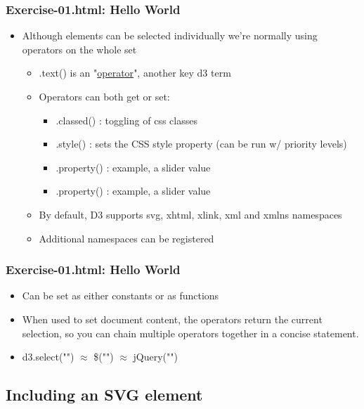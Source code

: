 \documentclass{beamer}
\begin{document}
\begin{frame}
    \frametitle{Exercise-01.html: Hello World}
    \begin{itemize}
    \item Although elements can be selected individually we're normally using operators on the whole set
        \begin{itemize}
        \item .text() is an "\underline{operator}", another key d3 term
        \item Operators can both get or set:
            \begin{itemize}
            \item .classed() : toggling of css classes
            \item .style() : sets the CSS style property (can be run w/ priority levels)
            \item .property() : example, a slider value
            \item .property() : example, a slider value
            \end{itemize}
        \item By default, D3 supports svg, xhtml, xlink, xml and xmlns namespaces
        \item Additional namespaces can be registered
        \end{itemize}
    \end{itemize}
\end{frame}



\begin{frame}
    \frametitle{Exercise-01.html: Hello World}
    \begin{itemize}
    \item Can be set as either constants or as functions
    \item When used to set document content, the operators return the current selection, so you can chain multiple operators together in a concise statement.
    \item d3.select("") $\approx$ \$("") $\approx$ jQuery("")
    \end{itemize}
\end{frame}




\subsection{Including an SVG element}
\end{document}

